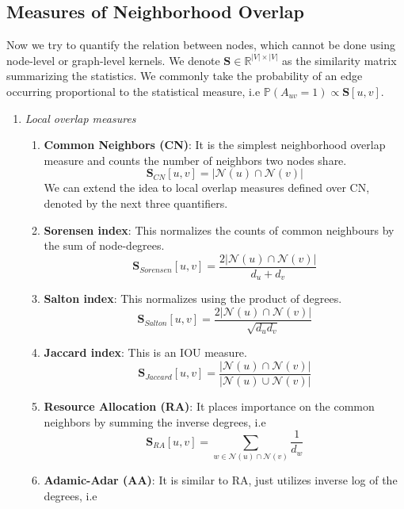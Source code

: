 \subsection{Measures of Neighborhood Overlap}
Now we try to quantify the relation between nodes, which cannot be done using node-level or graph-level kernels. We denote $\mathbf{S} \in \mathbb{R}^{|V| \times |V|}$ as the similarity matrix summarizing the statistics. We commonly take the probability of an edge occurring proportional to the statistical measure, i.e $\mathbb{P}(A_{uv} = 1) \propto \mathbf{S}[u,v]$.
\begin{enumerate}
	\item \textit{Local overlap measures}
\begin{enumerate}
\item \textbf{Common Neighbors (CN)}: It is the simplest neighborhood overlap measure and counts the number of neighbors two nodes share.
\begin{equation}
	\mathbf{S}_{CN}[u, v] = |\mathcal{N}(u) \cap \mathcal{N}(v)|
\end{equation}	
We can extend the idea to local overlap measures defined over CN, denoted by the next three quantifiers.
\item \textbf{Sorensen index}: This normalizes the counts of common neighbours by the sum of node-degrees.
\begin{equation}
	\mathbf{S}_{Sorensen}[u, v] = \dfrac{2|\mathcal{N}(u) \cap \mathcal{N}(v)|}{d_u + d_v}
\end{equation}
\item \textbf{Salton index}: This normalizes using the product of degrees.
\begin{equation}
	\mathbf{S}_{Salton}[u, v] = \dfrac{2|\mathcal{N}(u) \cap \mathcal{N}(v)|}{\sqrt{d_ud_v}}
\end{equation}
\item \textbf{Jaccard index}: This is an IOU measure.
\begin{equation}
	\mathbf{S}_{Jaccard}[u, v] = \dfrac{|\mathcal{N}(u) \cap \mathcal{N}(v)|}{|\mathcal{N}(u) \cup \mathcal{N}(v)|}
\end{equation}
\item \textbf{Resource Allocation (RA)}: It places importance on the common neighbors by summing the inverse degrees, i.e
\begin{equation}
	\mathbf{S}_{RA}[u, v] = \sum_{w \in \mathcal{N}(u) \cap \mathcal{N}(v)} \dfrac{1}{d_w}
\end{equation}
\item \textbf{Adamic-Adar (AA)}: It is similar to RA, just utilizes inverse log of the degrees, i.e

\end{enumerate}
\end{enumerate}
